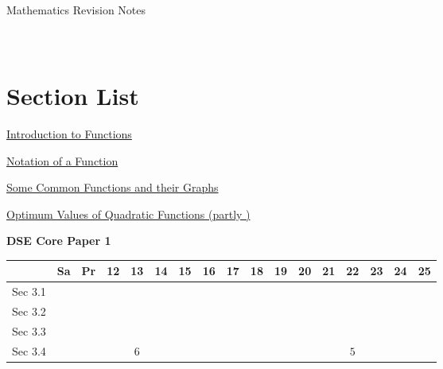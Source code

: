 \documentclass[12pt, a4paper]{article}
\begin{document}
\newpage
\newpage
\thispagestyle{empty}
\begin{center}
Mathematics Revision Notes\\\vspace{1cm}
\\\vspace{1cm}
{\fontsize{24pt}{24pt}\selectfont {Functions and Graphs}} \\\vspace{1cm}
\label{chapter:S4-3}

\end{center}
\vspace{0.5cm}
\hline
\section*{Section List}
\begin{enumx}[label=Sec 3.\arabic*\ ]
\item \hyperref[section:4-3-1]{Introduction to Functions }
\item \hyperref[section:4-3-2]{Notation of a Function }
\item \hyperref[section:4-3-3]{Some Common Functions and their Graphs}
\item \hyperref[section:4-3-4]{Optimum Values of Quadratic Functions (partly \NF)}
\end{enumx}
\begin{absolutelynopagebreak}
\begin{center}
\textbf{DSE Core Paper 1}
\end{center}
\begin{center}
\begin{tabular}{|l|c|c|c|c|c|c|c|c|c|c|c|c|c|c|c|c|}
\hline
        & Sa & Pr & 12 & 13 & 14 & 15 & 16 & 17 & 18 & 19 & 20 & 21 & 22 & 23 & 24 & 25 \\\hline\hline
Sec 3.1 &  &  &  &  &  &  &  &  &  &  &  &  &  &  &  &  \\\hline
Sec 3.2 &  &  &  &  &  &  &  &  &  &  &  &  &  &  &  &  \\\hline
Sec 3.3 &  &  &  &  &  &  &  &  &  &  &  &  &  &  &  &  \\\hline
Sec 3.4 &  &  &  &  $6$ &  &  &  &  &  &  &  &  &  $5$ &  &  &  \\\hline
\end{tabular}
\end{center}
\end{absolutelynopagebreak}
\end{document}
